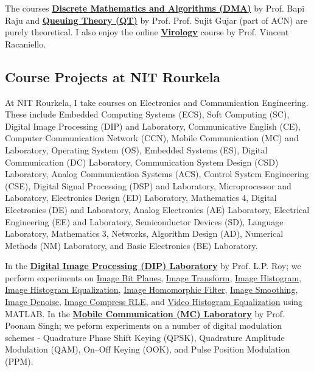 The courses \textbf{\href{https://github.com/iiithf/discrete-mathematics-and-algorithms}{Discrete Mathematics and Algorithms (DMA)}} by Prof. Bapi Raju and \textbf{\href{https://github.com/iiithf/queuing-theory}{Queuing Theory (QT)}} by Prof. Prof. Sujit Gujar (part of ACN) are purely theoretical. I also enjoy the online \textbf{\href{https://github.com/iiithf/virology}{Virology}} course by Prof. Vincent Racaniello.




\subsection{Course Projects at NIT Rourkela}

At NIT Rourkela, I take courses on Electronics and Communication Engineering. These include Embedded Computing Systems (ECS), Soft Computing (SC), Digital Image Processing (DIP) and Laboratory, Communicative English (CE), Computer Communication Network (CCN), Mobile Communication (MC) and Laboratory, Operating System (OS), Embedded Systems (ES), Digital Communication (DC) Laboratory, Communication System Design (CSD) Laboratory, Analog Communication Systems (ACS), Control System Engineering (CSE), Digital Signal Processing (DSP) and Laboratory, Microprocessor and Laboratory, Electronics Design (ED) Laboratory, Mathematics 4, Digital Electronics (DE) and Laboratory, Analog Electronics (AE) Laboratory, Electrical Engineering (EE) and Laboratory, Semiconductor Devices (SD), Language Laboratory, Mathematics 3, Networks, Algorithm Design (AD), Numerical Methods (NM) Laboratory, and Basic Electronics (BE) Laboratory.

In the \textbf{\href{https://github.com/nitrece/digital-image-processing-laboratory}{Digital Image Processing (DIP) Laboratory}} by Prof. L.P. Roy; we perform experiments on \href{https://github.com/matlabf/image-bit-planes}{Image Bit Planes}, \href{https://github.com/matlabf/image-transform}{Image Transform}, \href{https://github.com/matlabf/image-histogram}{Image Histogram}, \href{https://github.com/matlabf/image-histogram-equalization}{Image Histogram Equalization}, \href{https://github.com/matlabf/image-homomorphic-filter}{Image Homomorphic Filter}, \href{https://github.com/matlabf/image-smoothing}{Image Smoothing}, \href{https://github.com/matlabf/image-denoise}{Image Denoise}, \href{https://github.com/matlabf/image-compress-rle}{Image Compress RLE}, and \href{https://github.com/matlabf/video-histogram-equalization}{Video Histogram Equalization} using MATLAB. In the \textbf{\href{https://github.com/nitrece/mobile-communication-laboratory}{Mobile Communication (MC) Laboratory}} by Prof. Poonam Singh; we peform experiments on a number of digital modulation schemes - Quadrature Phase Shift Keying (QPSK), Quadrature Amplitude Modulation (QAM), On–Off Keying (OOK), and Pulse Position Modulation (PPM).

